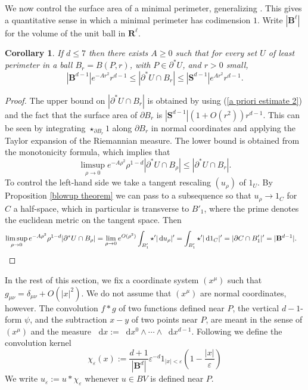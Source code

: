 \documentclass[reqno,10pt]{amsart}
\newcommand{\RR}{\mathbf{R}}
\newcommand{\Sph}{\mathbf S}
\newcommand{\Ball}{\mathbf{B}}
\newcommand*\dif{\mathop{}\!\mathrm{d}}
\newtheorem{corollary}[theorem]{Corollary}
\theoremstyle{definition}
\numberwithin{equation}{section}
\begin{document}
We now control the surface area of a minimal perimeter, generalizing \cite[Remark 5.13]{Giusti77}.
This gives a quantitative sense in which a minimal perimeter has codimension $1$.
Write $|\Ball^\ell|$ for the volume of the unit ball in $\RR^\ell$.

\begin{corollary}\label{doubling dimension}
If $d \leq 7$ then there exists $A \geq 0$ such that for every set $U$ of least perimeter in a ball $B_r = B(P, r)$, with $P \in \partial^* U$, and $r > 0$ small,
$$|\Ball^{d - 1}|e^{-Ar^2}r^{d - 1} \leq |\partial^*U \cap B_r| \leq |\Sph^{d - 1}|e^{Ar^2} r^{d - 1}.$$
\end{corollary}
\begin{proof}
The upper bound on $|\partial^* U \cap B_r|$ is obtained by using (\ref{a priori estimate 2}) and the fact that the surface area of $\partial B_r$ is $|\Sph^{d - 1}|(1 + O(r^2))r^{d - 1}$.
This can be seen by integrating $\star_{\partial B_r} 1$ along $\partial B_r$ in normal coordinates and applying the Taylor expansion of the Riemannian measure.
The lower bound is obtained from the monotonicity formula, which implies that
$$\limsup_{\rho \to 0} e^{-A\rho^2} \rho^{1 - d} |\partial^* U \cap B_\rho| \leq |\partial^* U \cap B_r|.$$
To control the left-hand side we take a tangent rescaling $(u_\rho)$ of $1_U$.
By Proposition \ref{blowup theorem} we can pass to a subsequence so that $u_\rho \to 1_C$ for $C$ a half-space, which in particular is transverse to $B'_1$, where the prime denotes the euclidean metric on the tangent space.
Then
\begin{align*}
\limsup_{\rho \to 0} e^{-A\rho^2} \rho^{1 - d} |\partial^* U \cap B_\rho| &= \lim_{\rho \to 0} e^{O(\rho^2)} \int_{B'_1} \star'|\dif u_\rho|' = \int_{B'_1} \star'|\dif 1_C|' = |\partial C \cap B'_1|' = |\Ball^{d - 1}|. \qedhere
\end{align*}
\end{proof}

In the rest of this section, we fix a coordinate system $(x^\mu)$ such that $g_{\mu\nu} = \delta_{\mu\nu} + O(|x|^2)$.
We do not assume that $(x^\mu)$ are normal coordinates, however.
The convolution $f * g$ of two functions defined near $P$, the vertical $d-1$-form $\psi$, and the subtraction $x - y$ of two points near $P$, are meant in the sense of $(x^\mu)$ and the measure $\dif x := \dif x^0 \wedge \cdots \wedge \dif x^{d - 1}$.
Following \cite[Chapter 7]{Giusti77} we define the convolution kernel
$$\chi_\varepsilon(x) := \frac{d + 1}{|\Ball^d|} \varepsilon^{-d}1_{|x| < \varepsilon} \left(1 - \frac{|x|}{\varepsilon}\right)$$
We write $u_\varepsilon := u * \chi_\varepsilon$ whenever $u \in BV$ is defined near $P$.
\end{document}
